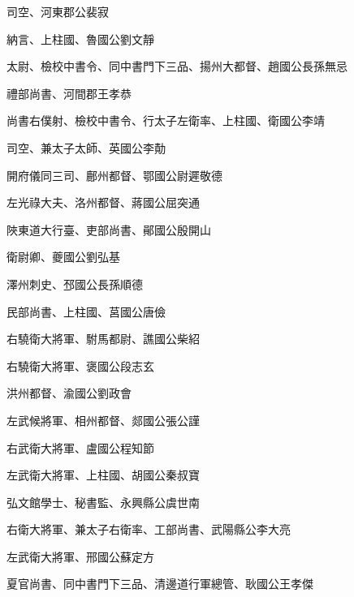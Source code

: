 \begin{pinyinscope}
 司空、河東郡公裴寂



 納言、上柱國、魯國公劉文靜



 太尉、檢校中書令、同中書門下三品、揚州大都督、趙國公長孫無忌



 禮部尚書、河間郡王孝恭



 尚書右僕射、檢校中書令、行太子左衛率、上柱國、衛國公李靖



 司空、兼太子太師、英國公李勣



 開府儀同三司、鄜州都督、鄂國公尉遲敬德



 左光祿大夫、洛州都督、蔣國公屈突通



 陜東道大行臺、吏部尚書、鄖國公殷開山



 衛尉卿、夔國公劉弘基



 澤州刺史、邳國公長孫順德



 民部尚書、上柱國、莒國公唐儉



 右驍衛大將軍、駙馬都尉、譙國公柴紹



 右驍衛大將軍、褒國公段志玄



 洪州都督、渝國公劉政會



 左武候將軍、相州都督、郯國公張公謹



 右武衛大將軍、盧國公程知節



 左武衛大將軍、上柱國、胡國公秦叔寶



 弘文館學士、秘書監、永興縣公虞世南



 右衛大將軍、兼太子右衛率、工部尚書、武陽縣公李大亮



 左武衛大將軍、邢國公蘇定方



 夏官尚書、同中書門下三品、清邊道行軍總管、耿國公王孝傑




\end{pinyinscope}
